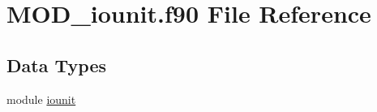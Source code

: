\hypertarget{MOD__iounit_8f90}{\section{M\-O\-D\-\_\-iounit.\-f90 File Reference}
\label{MOD__iounit_8f90}
}
\subsection*{Data Types}
\begin{DoxyCompactItemize}
\item 
module \hyperlink{classiounit}{iounit}
\end{DoxyCompactItemize}
